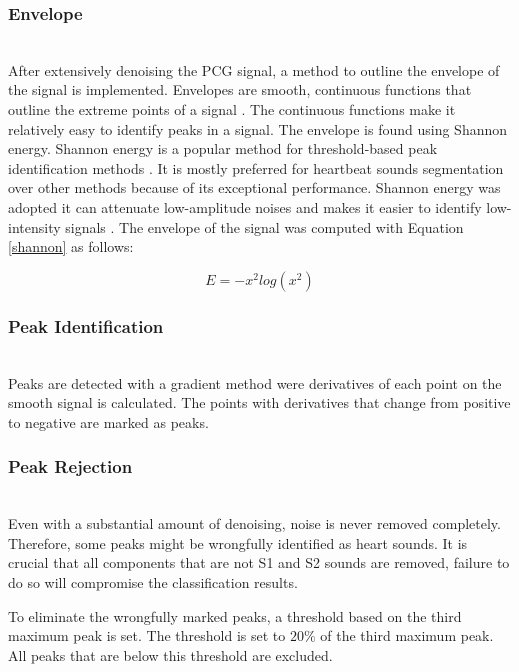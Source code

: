\documentclass[10pt,twocolumn]{witseiepaper}
\begin{document}
\subsubsection{Envelope}
\textcolor{white}{.................}\\
After extensively denoising the PCG signal, a method to outline the envelope of the signal is implemented.
Envelopes are smooth, continuous functions that outline the extreme points of a signal \cite{29}.
The continuous functions make it relatively easy to identify peaks in a signal. The 
envelope is found using Shannon energy. Shannon energy is a popular method for threshold-based
peak identification methods \cite{11}. It is mostly preferred for
heartbeat sounds segmentation over other methods 
because of its exceptional performance. Shannon energy was adopted
it can attenuate low-amplitude noises and makes it easier to identify
low-intensity signals \cite{19}. The envelope of the signal was computed with Equation \ref{shannon} as follows:

\begin{equation}
    E = -x^2log(x^2)
    \label{shannon}
\end{equation}
\vspace{-1cm}
\subsubsection{Peak Identification}
\textcolor{white}{.................}\\
 Peaks are detected with a gradient method were derivatives of each point on the smooth signal is calculated. The points with derivatives that change from positive to negative are marked as peaks.

\subsubsection{Peak Rejection}
\textcolor{white}{.................}\\
Even with a substantial amount of denoising, noise is never removed completely. Therefore, some peaks might be wrongfully identified as heart sounds. It is crucial that all components that are not S1 and S2 sounds are removed, failure to do so will compromise the classification results.

To eliminate the wrongfully marked peaks, a threshold based on the third maximum peak is set. The threshold is set to $20\%$ of the third maximum peak. All peaks that are below this threshold are excluded.
\end{document}
